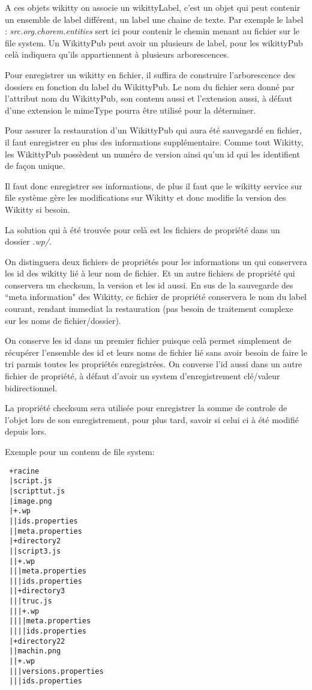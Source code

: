 A ces objets wikitty on associe un wikittyLabel, c'est un objet qui peut
contenir un ensemble de label différent, un label une chaine de texte.
Par exemple le label : \emph{src.org.chorem.entities} sert ici pour contenir le
chemin menant au fichier sur le file system. Un WikittyPub peut avoir un
plusieurs de label, pour les wikittyPub celà indiquera qu'ils appartiennent à
plusieurs arborescences.

Pour enregistrer un wikitty en fichier, il suffira de construire l'arborescence
des dossiers en fonction du label du WikittyPub. Le nom du fichier sera donné
par l'attribut nom du WikittyPub, son contenu aussi et l'extension aussi, à
défaut d'une extension le mimeType pourra être utilisé pour la déterminer.

Pour assurer la restauration d'un WikittyPub qui aura été sauvegardé en fichier,
il faut enregistrer en plus des informations supplémentaire. Comme tout Wikitty,
les WikittyPub possèdent un numéro de version ainsi qu'un id qui les identifient
de façon unique.

Il faut donc enregistrer ses informations, de plus il faut que le wikitty
service sur file système gère les modifications sur Wikitty et donc modifie la
version des Wikitty si besoin.

La solution qui à été trouvée pour celà est les fichiers de propriété dans un
dossier \emph{.wp/}. 

On distinguera deux fichiers de propriétés pour les informations un qui 
conservera les id des wikitty lié à leur nom de fichier. Et un autre fichiers de
propriété qui conservera un checksum, la version et les id aussi. En sus de
la sauvegarde des ``meta information" des Wikitty, ce fichier de propriété
conservera le nom du label courant, rendant immediat la restauration (pas
besoin de traitement complexe sur les noms de fichier/dossier).

On conserve les id dans un premier fichier puisque celà permet simplement de 
récupérer l'ensemble des id et leurs noms de fichier lié sans avoir besoin de 
faire le tri parmis toutes les propriétés enregistrées. On converse l'id aussi 
dans un autre fichier de propriété, à défaut d'avoir un system d'enregistrement
clé/valeur bidirectionnel. 

La propriété checksum sera utilisée pour enregistrer la somme de controle de 
l'objet lors de son enregistrement, pour plus tard, savoir si celui ci à été
modifié depuis lors.

Exemple pour un contenu de file system:
\begin{verbatim}
 +racine
 |script.js
 |scripttut.js
 |image.png
 |+.wp
 ||ids.properties 
 ||meta.properties 
 |+directory2
 ||script3.js
 ||+.wp
 |||meta.properties
 |||ids.properties 
 ||+directory3
 |||truc.js
 |||+.wp
 ||||meta.properties
 ||||ids.properties 
 |+directory22
 ||machin.png
 ||+.wp
 |||versions.properties
 |||ids.properties 
\end{verbatim}


